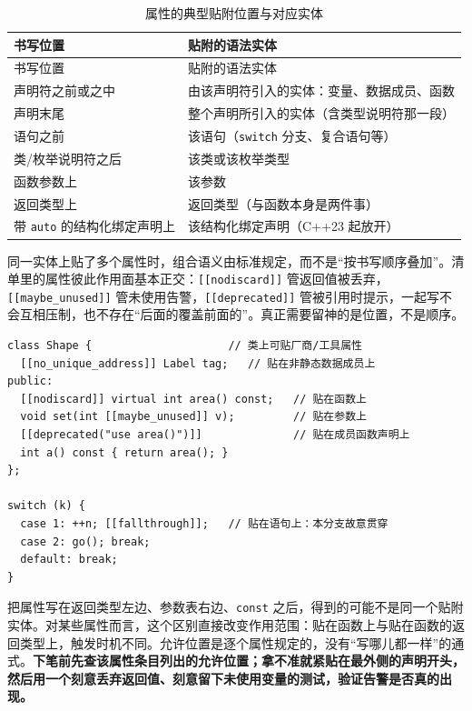 \documentclass[12pt,a4paper,fontset=fandol]{ctexbook}
\newcommand{\cppxxlabel}[1]{%
  \tcbox[on line,colback=cpp20bg,colframe=cpp20bg,
    boxrule=0pt,arc=1pt,left=2pt,right=2pt,top=1pt,bottom=1pt,
    colupper=white,fontupper=\scriptsize\bfseries]{#1}}
\newcommand{\cpp}[1]{C++#1}
\newcommand{\kw}[1]{\texttt{#1}}
\begin{document}
{\footnotesize
\begin{longtable}{@{}>{\raggedright\arraybackslash}p{}>{\raggedright\arraybackslash}p{}@{}}
\caption{属性的典型贴附位置与对应实体}\label{tab:ch2-appertains}\\
\toprule
书写位置 & 贴附的语法实体 \\ \midrule
\endfirsthead
\toprule
书写位置 & 贴附的语法实体 \\ \midrule
\endhead
\bottomrule
\endfoot
声明符之前或之中 & 由该声明符引入的实体：变量、数据成员、函数 \\
声明末尾 & 整个声明所引入的实体（含类型说明符那一段） \\
语句之前 & 该语句（\texttt{switch} 分支、复合语句等） \\
类/枚举说明符之后 & 该类或该枚举类型 \\
函数参数上 & 该参数 \\
返回类型上 & 返回类型（与函数本身是两件事） \\
带 \kw{auto} 的结构化绑定声明上 & 该结构化绑定声明（\cpp{23} 起放开） \\
\end{longtable}}

同一实体上贴了多个属性时，组合语义由标准规定，而不是“按书写顺序叠加”。清单里的属性彼此作用面基本正交：\texttt{[[nodiscard]]} 管返回值被丢弃，\texttt{[[maybe\_unused]]} 管未使用告警，\texttt{[[deprecated]]} 管被引用时提示，一起写不会互相压制，也不存在“后面的覆盖前面的”。真正需要留神的是位置，不是顺序。

\cppxxlabel{C++17}
\begin{lstlisting}[style=cppstyle, caption={不同位置、不同贴附目标}, label={lst:ch2-cpp-appertains}]
class Shape {                     // 类上可贴厂商/工具属性
  [[no_unique_address]] Label tag;   // 贴在非静态数据成员上
public:
  [[nodiscard]] virtual int area() const;   // 贴在函数上
  void set(int [[maybe_unused]] v);         // 贴在参数上
  [[deprecated("use area()")]]              // 贴在成员函数声明上
  int a() const { return area(); }
};

switch (k) {
  case 1: ++n; [[fallthrough]];   // 贴在语句上：本分支故意贯穿
  case 2: go(); break;
  default: break;
}
\end{lstlisting}

\begin{warning}[title={左右挪一个位置，贴附目标就变了}]
把属性写在返回类型左边、参数表右边、\texttt{const} 之后，得到的可能不是同一个贴附实体。对某些属性而言，这个区别直接改变作用范围：贴在函数上与贴在函数的返回类型上，触发时机不同。允许位置是逐个属性规定的，没有“写哪儿都一样”的通式。\textbf{下笔前先查该属性条目列出的允许位置；拿不准就紧贴在最外侧的声明开头，然后用一个刻意丢弃返回值、刻意留下未使用变量的测试，验证告警是否真的出现。}
\end{warning}
\end{document}
